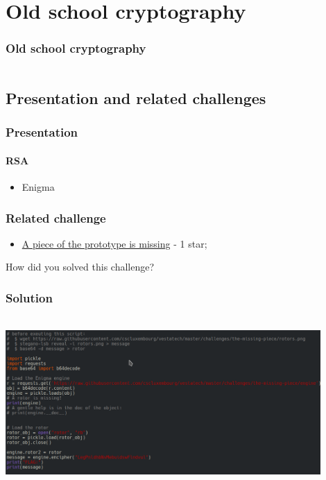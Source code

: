 \documentclass[]{beamer}
\begin{document}
%
%
\section{Old school cryptography}
\begin{frame}
    \frametitle{Old school cryptography}
    \begin{columns}[t]
        \begin{column}{5cm}
            \tableofcontents[sections={1-3}, currentsection, hideothersubsections]
        \end{column}
        \begin{column}{5cm}
            \tableofcontents[sections={4-5}, currentsection, hideothersubsections]
        \end{column}
    \end{columns}
\end{frame}
\subsection{Presentation and related challenges}
\begin{frame}
\frametitle{Presentation}
\framesubtitle{RSA}
\begin{itemize}
    \item Enigma
\end{itemize}
\end{frame}

\begin{frame}
\frametitle{Related challenge}
\begin{itemize}
    \item \href{https://github.com/cscluxembourg/vestatech/tree/master/challenges/the-missing-piece}{A piece of the prototype is missing} - 1 star;
\end{itemize}
\bigskip
How did you solved this challenge?
\end{frame}

\begin{frame}
\frametitle{Solution}
\begin{center}
    \includegraphics[height=6.5cm, width=12.0cm]{./images/Enigma_solution.png}
\end{center}
\end{frame}
\end{document}
